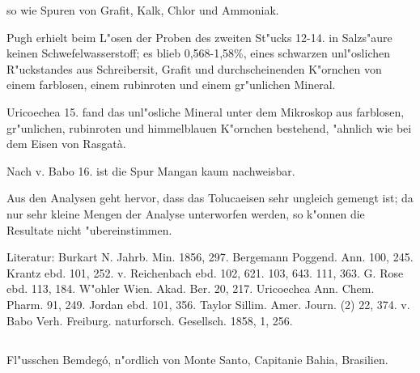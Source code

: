 \documentclass[a4paper, 11pt, oneside]{article}
\begin{document}
so wie Spuren von Grafit, Kalk, Chlor und Ammoniak.

Pugh erhielt beim L"osen der Proben des zweiten St"ucks 12-14. in Salzs"aure keinen Schwefelwasserstoff; es blieb 0,568-1,58\%, eines schwarzen unl"oslichen R"uckstandes aus Schreibersit, Grafit und durchscheinenden K"ornchen von einem farblosen, einem rubinroten und einem gr"unlichen Mineral.

Uricoechea 15. fand das unl"osliche Mineral unter dem Mikroskop aus farblosen, gr"unlichen, rubinroten und himmelblauen K"ornchen bestehend, "ahnlich wie bei dem Eisen von Rasgatà.

Nach v. Babo 16. ist die Spur Mangan kaum nachweisbar.

Aus den Analysen geht hervor, dass das Tolucaeisen sehr ungleich gemengt ist; da nur sehr kleine Mengen der Analyse unterworfen werden, so k"onnen die Resultate nicht "ubereinstimmen.

\normalsize
Literatur: Burkart N. Jahrb. Min. 1856, 297. Bergemann Poggend. Ann. 100, 245. Krantz ebd. 101, 252. v. Reichenbach ebd. 102, 621. 103, 643. 111, 363. G. Rose ebd. 113, 184. W"ohler Wien. Akad. Ber. 20, 217. Uricoechea Ann. Chem. Pharm. 91, 249. Jordan ebd. 101, 356. Taylor Sillim. Amer. Journ. (2) 22, 374. v. Babo Verh. Freiburg. naturforsch. Gesellsch. 1858, 1, 256.

\subsection{}
\LARGE
\paragraph{}
Fl"usschen Bemdegó, n"ordlich von Monte Santo, Capitanie Bahia, Brasilien.
\end{document}

